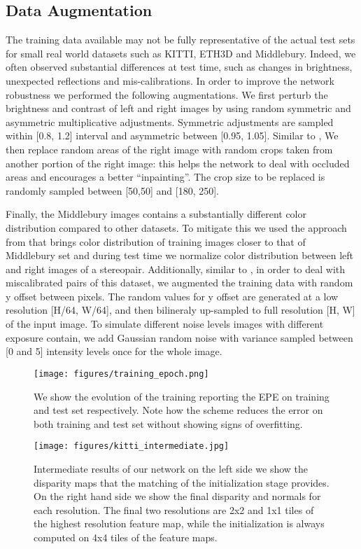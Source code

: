 \documentclass[final]{cvpr}
\begin{document}
\subsection{Data Augmentation}
The training data available may not be fully representative of the actual test sets for small real world datasets such as KITTI, ETH3D and Middlebury. Indeed, we often observed substantial differences at test time, such as changes in brightness, unexpected reflections and mis-calibrations. In order to improve the network robustness we performed the following augmentations. We first perturb the brightness and contrast of left and right images by using random symmetric and asymmetric multiplicative adjustments. Symmetric adjustments are sampled within [0.8, 1.2] interval and asymmetric between [0.95, 1.05].  Similar to \cite{hsmnet}, We then replace random areas of the right image with random crops taken from another portion of the right image: this helps the network to deal with occluded areas and encourages a better ``inpainting''. The crop size to be replaced is randomly sampled between [50,50] and [180, 250].

Finally, the Middlebury images contains a substantially different color distribution compared to other datasets. To mitigate this we used the approach from \cite{song2020adastereo} that brings color distribution of training images closer to that of Middlebury set and during test time we normalize color distribution between left and right images of a stereopair. Additionally, similar to \cite{hsmnet}, in order to deal with miscalibrated pairs of this dataset, we augmented the training data with random y offset between  pixels. The random values for y offset are generated at a low resolution [H/64, W/64], and then bilineraly up-sampled to full resolution [H, W] of the input image. To simulate different noise levels images with different exposure contain, we add Gaussian random noise with variance sampled between [0 and 5] intensity levels once for the whole image.

\begin{figure*}[htb]
    \centering
    \texttt{[image: figures/training\_epoch.png]}
    \caption{We show the evolution of the training reporting the EPE on training and test set respectively. Note how the scheme reduces the error on both training and test set without showing signs of overfitting.}
    \label{fig:training}
\end{figure*}

\begin{figure*}[htb]
    \centering
    \texttt{[image: figures/kitti\_intermediate.jpg]}
    \vspace{-30pt}
    \caption{Intermediate results of our network on the left side we show the disparity maps that the matching of the initialization stage provides. On the right hand side we show the final disparity and normals for each resolution. The final two resolutions are 2x2 and 1x1 tiles of the highest resolution feature map, while the initialization is always computed on 4x4 tiles of the feature maps.}
    \label{fig:kitti_intermediate}
\end{figure*}
\end{document}
